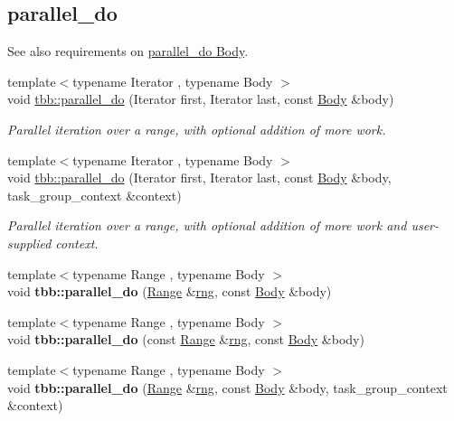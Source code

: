 \subsection*{parallel\+\_\+do}
\label{_amgrp751e5e5b1749802e9339f8ae6e071bc7}%
See also requirements on \hyperlink{parallel_do_body_req}{parallel\+\_\+do Body}. \begin{DoxyCompactItemize}
\item 
{\footnotesize template$<$typename Iterator , typename Body $>$ }\\void \hyperlink{group__algorithms_ga533f6732498ade8634a9470cbf89192d}{tbb\+::parallel\+\_\+do} (Iterator first, Iterator last, const \hyperlink{classBody}{Body} \&body)
\begin{DoxyCompactList}\small\item\em Parallel iteration over a range, with optional addition of more work. \end{DoxyCompactList}\item 
{\footnotesize template$<$typename Iterator , typename Body $>$ }\\void \hyperlink{group__algorithms_ga7db29bc10d81eddc85854256ffc723c0}{tbb\+::parallel\+\_\+do} (Iterator first, Iterator last, const \hyperlink{classBody}{Body} \&body, task\+\_\+group\+\_\+context \&context)
\begin{DoxyCompactList}\small\item\em Parallel iteration over a range, with optional addition of more work and user-\/supplied context. \end{DoxyCompactList}\item 
\hypertarget{group__algorithms_ga135f72b966cd78a14f6aa1ddf0480701}{}{\footnotesize template$<$typename Range , typename Body $>$ }\\void {\bfseries tbb\+::parallel\+\_\+do} (\hyperlink{classtbb_1_1blocked__range}{Range} \&\hyperlink{structrng}{rng}, const \hyperlink{classBody}{Body} \&body)\label{group__algorithms_ga135f72b966cd78a14f6aa1ddf0480701}

\item 
\hypertarget{group__algorithms_gaaaf7a7c53d20fef24acaa2fe5cc36b45}{}{\footnotesize template$<$typename Range , typename Body $>$ }\\void {\bfseries tbb\+::parallel\+\_\+do} (const \hyperlink{classtbb_1_1blocked__range}{Range} \&\hyperlink{structrng}{rng}, const \hyperlink{classBody}{Body} \&body)\label{group__algorithms_gaaaf7a7c53d20fef24acaa2fe5cc36b45}

\item 
\hypertarget{group__algorithms_ga137e8ff95a0c69e747f4f4f1383a2677}{}{\footnotesize template$<$typename Range , typename Body $>$ }\\void {\bfseries tbb\+::parallel\+\_\+do} (\hyperlink{classtbb_1_1blocked__range}{Range} \&\hyperlink{structrng}{rng}, const \hyperlink{classBody}{Body} \&body, task\+\_\+group\+\_\+context \&context)\label{group__algorithms_ga137e8ff95a0c69e747f4f4f1383a2677}


\end{DoxyCompactItemize}
